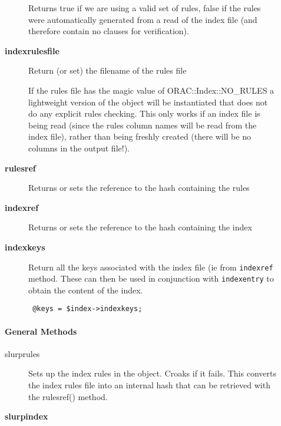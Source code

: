 \begin{description}
\begin{description}
Returns true if we are using a valid set of rules, false
if the rules were automatically generated from a read of the
index file (and therefore contain no clauses for verification).


\item[{\textbf{indexrulesfile}}] \mbox{}

Return (or set) the filename of the rules file



If the rules file has the magic value of ORAC::Index::NO\_RULES a lightweight
version of the object will be instantiated that does not do any
explicit rules checking. This only works if an index file is being
read (since the rules column names will be read from the index file),
rather than being freshly created (there will be no columns in the
output file!).


\item[{\textbf{rulesref}}] \mbox{}

Returns or sets the reference to the hash containing the rules


\item[{\textbf{indexref}}] \mbox{}

Returns or sets the reference to the hash containing the index


\item[{\textbf{indexkeys}}] \mbox{}

Return all the keys associated with the index file (ie from \texttt{indexref}
method. These can then be used in conjunction with \texttt{indexentry} to obtain
the content of the index.

\begin{verbatim}
 @keys = $index->indexkeys;
\end{verbatim}
\end{description}
\paragraph*{General Methods\label{ORAC::Index_General_Methods}}
\begin{description}

\item[{slurprules}] \mbox{}

Sets up the index rules in the object. Croaks if it fails.
This converts the index rules file into an internal hash
that can be retrieved with the rulesref() method.


\item[{\textbf{slurpindex}}] \mbox{}


\end{description}
\end{description}

